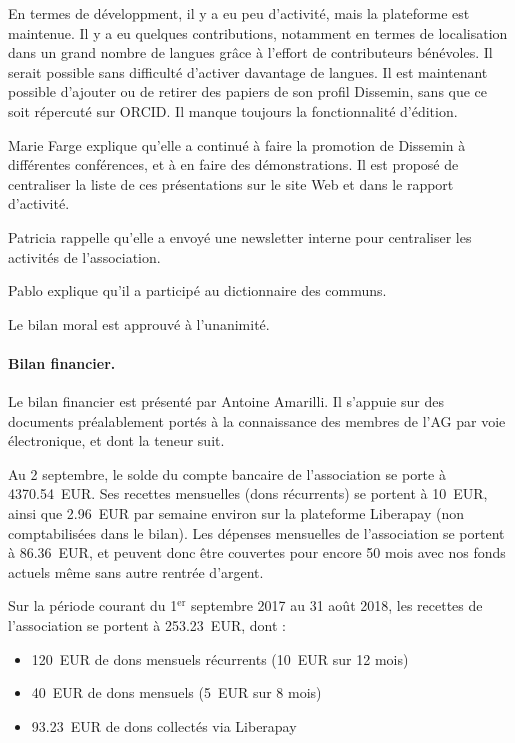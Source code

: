 \documentclass{scrartcl}
\begin{document}
En termes de développment, il y a eu peu d'activité, mais la plateforme est
maintenue. Il y a eu quelques contributions, notamment en termes de
localisation dans un grand nombre de langues grâce à l'effort de contributeurs
bénévoles. Il serait possible sans difficulté d'activer davantage de langues. Il
est maintenant possible d'ajouter ou de retirer des papiers de son profil
Dissemin, sans que ce soit répercuté sur ORCID. Il manque toujours la
fonctionnalité d'édition.

Marie Farge explique qu'elle a continué à faire la promotion de Dissemin à
différentes conférences, et à en faire des démonstrations. Il est proposé de
centraliser la liste de ces présentations sur le site Web et dans le rapport
d'activité.

Patricia rappelle qu'elle a envoyé une newsletter interne pour centraliser les
activités de l'association.

Pablo explique qu'il a participé au dictionnaire des communs.

Le bilan moral est approuvé à l'unanimité.

\paragraph{Bilan financier.} Le bilan financier est présenté par Antoine
Amarilli. Il s'appuie sur des documents préalablement portés à la connaissance des
membres de l'AG par voie électronique, et dont la teneur suit.

Au 2 septembre, le solde du compte bancaire de l'association se porte à
4370.54~EUR. Ses recettes mensuelles (dons récurrents) se portent à 10~EUR,
ainsi que 2.96~EUR par semaine environ sur la plateforme Liberapay (non
comptabilisées dans le bilan). Les dépenses mensuelles de l'association se
portent à 86.36~EUR, et peuvent donc être couvertes pour encore 50 mois avec nos
fonds actuels même sans autre rentrée d'argent.
 
Sur la période courant du 1$^{\mathrm{er}}$ septembre 2017 au 31 août 2018, les
recettes de l'association se portent à 253.23~EUR, dont :

\begin{itemize}
  \item 120~EUR de dons mensuels récurrents (10~EUR sur 12 mois)
  \item 40~EUR de dons mensuels (5~EUR sur 8 mois)
  \item 93.23~EUR de dons collectés via Liberapay
\end{itemize}
\end{document}
